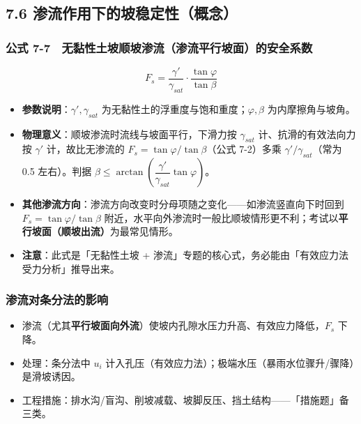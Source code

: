 \documentclass[
]{article}
\providecommand{\tightlist}{%
  \setlength{\itemsep}{0pt}\setlength{\parskip}{0pt}}
\begin{document}
\subsection{7.6
渗流作用下的坡稳定性（概念）}\label{ux6e17ux6d41ux4f5cux7528ux4e0bux7684ux5761ux7a33ux5b9aux6027ux6982ux5ff5}

\subsubsection{公式
7-7　无黏性土坡顺坡渗流（渗流平行坡面）的安全系数}\label{ux516cux5f0f-7-7-ux65e0ux9ecfux6027ux571fux5761ux987aux5761ux6e17ux6d41ux6e17ux6d41ux5e73ux884cux5761ux9762ux7684ux5b89ux5168ux7cfbux6570}

\[F_s=\frac{\gamma'}{\gamma_{sat}}\cdot\frac{\tan\varphi}{\tan\beta}\]

\begin{itemize}
\tightlist
\item
  \textbf{参数说明}：\(\gamma',\gamma_{sat}\)
  为无黏性土的浮重度与饱和重度；\(\varphi,\beta\) 为内摩擦角与坡角。
\item
  \textbf{物理意义}：顺坡渗流时流线与坡面平行，下滑力按 \(\gamma_{sat}\)
  计、抗滑的有效法向力按 \(\gamma'\) 计，故比无渗流的
  \(F_s=\tan\varphi/\tan\beta\)（公式 7-2）多乘
  \(\gamma'/\gamma_{sat}\)（常为 0.5 左右）。判据
  \(\beta\le\arctan\left(\dfrac{\gamma'}{\gamma_{sat}}\tan\varphi\right)\)。
\item
  \textbf{其他渗流方向}：渗流方向改变时分母项随之变化------如渗流竖直向下时回到
  \(F_s=\tan\varphi/\tan\beta\)
  附近，水平向外渗流时一般比顺坡情形更不利；考试以\textbf{平行坡面（顺坡出流）}为最常见情形。
\item
  \textbf{注意}：此式是「无黏性土坡 +
  渗流」专题的核心式，务必能由「有效应力法受力分析」推导出来。
\end{itemize}

\subsubsection{渗流对条分法的影响}\label{ux6e17ux6d41ux5bf9ux6761ux5206ux6cd5ux7684ux5f71ux54cd}

\begin{itemize}
\tightlist
\item
  渗流（尤其\textbf{平行坡面向外流}）使坡内孔隙水压力升高、有效应力降低，\(F_s\)
  下降。
\item
  处理：条分法中 \(u_i\)
  计入孔压（有效应力法）；极端水压（暴雨水位骤升/骤降）是滑坡诱因。
\item
  工程措施：排水沟/盲沟、削坡减载、坡脚反压、挡土结构------「措施题」备三类。
\end{itemize}
\end{document}
